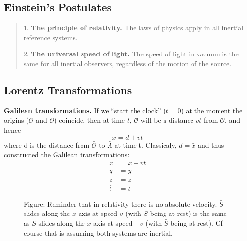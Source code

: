 \documentclass[../../main.tex]{subfiles}
\begin{document}
\subsection{Einstein's Postulates}
\begin{quote}
    1. \textbf{The principle of relativity.} The laws of physics apply in all inertial
reference systems.

    2. \textbf{The universal speed of light.} The speed of light in vacuum is the
same for all inertial observers, regardless of the motion of the source.
\end{quote}

\subsection{Lorentz Transformations}
\textbf{Galilean transformations.} If we “start the clock” ($t = 0$) at the moment the origins ($\mathcal{O}$ and $\bar{\mathcal{O}}$) coincide, then at time $t$, $\bar{\mathcal{O}}$ will be a distance $vt$ from $\mathcal{O}$, and hence
\begin{equation*}
    x=d + vt
\end{equation*}
where d is the distance from $\bar{\mathcal{O}}$ to $\bar{A}$ at time t. Classicaly, $d=\bar{x}$ and thus constructed the Galilean transformations:
\begin{align*}
    \bar{x} &= x - vt\\
    \bar{y} &= y\\
    \bar{z} &= z\\
    \bar{t} &= t
\end{align*}
\begin{figure}[b]
    \centering
    \caption*{Figure: Reminder that in relativity there is no absolute velocity. $\bar{S}$ slides along the $x$ axis at speed $v$ (with $S$ being at rest) is the same as $S$ slides along the $x$ axis at speed $-v$ (with $\bar{S}$ being at rest). Of course that is assuming both systems are inertial.}
\end{figure}
\end{document}
